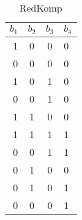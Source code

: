 \begin{table}[H]
\begin{subtable}{.12\linewidth}
\end{subtable}
\begin{subtable}{.16\linewidth}
\caption{RedKomp}
\label{1of10-reduct-c}

\begin{tabular}{|r@{}c@{}c@{}l|}
\hline
$b_1$ & $b_2$ & $b_3$ & $b_4$ \\
\hline
1 & 0 & 0 & 0 \\
0 & 0 & 0 & 0 \\
1 & 0 & 1 & 0 \\
0 & 0 & 1 & 0 \\
1 & 1 & 0 & 0 \\
1 & 1 & 1 & 1 \\
0 & 0 & 1 & 1 \\
0 & 1 & 0 & 0 \\
0 & 1 & 0 & 1 \\
0 & 0 & 0 & 1 \\
\hline
\end{tabular}

\end{subtable}
\end{table}
